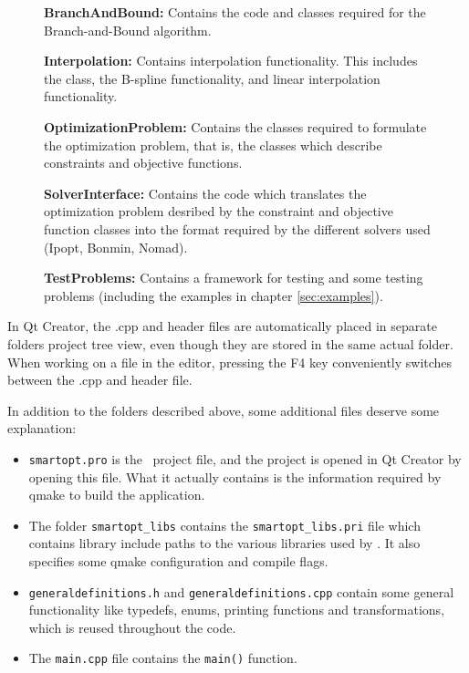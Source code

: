 \begin{figure}
{  	\textbf{BranchAndBound:} Contains the code and classes required for the Branch-and-Bound algorithm.
  
  	\textbf{Interpolation:} Contains interpolation functionality. This includes the  class, the B-spline functionality, and linear interpolation functionality.

	\textbf{OptimizationProblem:} Contains the classes required to formulate the optimization problem, that is, the classes which describe constraints and objective functions.

	\textbf{SolverInterface:} Contains the code which translates the optimization problem desribed by the constraint and objective function classes into the format required by the different solvers used (Ipopt, Bonmin, Nomad).

	\textbf{TestProblems:} Contains a framework for testing and some testing problems (including the examples in chapter \ref{sec:examples}).
}
\end{figure}
In Qt Creator, the .cpp and header files are automatically placed in separate folders project tree view, even though they are stored in the same actual folder. When working on a file in the editor, pressing the F4 key conveniently switches between the .cpp and header file.

In addition to the folders described above, some additional files deserve some explanation:
\begin{itemize}
\item
\texttt{smartopt.pro} is the \solvername\ project file, and the project is opened in Qt Creator by opening this file. What it actually contains is the information required by qmake to build the application.
\item
The folder \texttt{smartopt\_libs} contains the \texttt{smartopt\_libs.pri} file which contains library include paths to the various libraries used by \solvername. It also specifies some qmake configuration and compile flags.
\item
\texttt{generaldefinitions.h} and \texttt{generaldefinitions.cpp} contain some general functionality like typedefs, enums, printing functions and transformations, which is reused throughout the code. 
\item
The \texttt{main.cpp} file contains the \texttt{main()} function.
\end{itemize}
